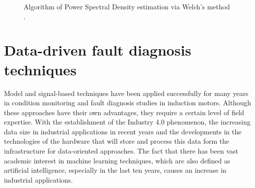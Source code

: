 \begin{figure}[!h]
	\centering
	\vspace{1cm}
	\caption{Algorithm of Power Spectral Density estimation via Welch's method \cite{solomon1991psd}.}	
	\label{welch}
\end{figure}
\pagebreak

\section{Data-driven fault diagnosis techniques}
Model and signal-based techniques have been applied successfully for many years in condition monitoring and fault diagnosis studies in induction motors. Although these approaches have their own advantages, they require a certain level of field expertise. With the establishment of the Industry 4.0 phenomenon, the increasing data size in industrial applications in recent years and the developments in the technologies of the hardware that will store and process this data form the infrastructure for data-oriented approaches. The fact that there has been vast academic interest in machine learning techniques, which are also defined as artificial intelligence, especially in the last ten years, causes an increase in industrial applications.

